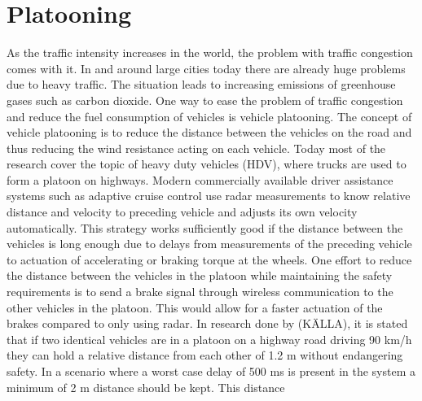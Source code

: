 \section{Platooning}
As the traffic intensity increases in the world, the problem with traffic congestion comes with it. In and around large cities today there are already huge problems due to heavy traffic. The situation leads to increasing emissions of greenhouse gases such as carbon dioxide. One way to ease the problem of traffic congestion and reduce the fuel consumption of vehicles is vehicle platooning. The concept of vehicle platooning is to reduce the distance between the vehicles on the road and thus reducing the wind resistance acting on each vehicle. Today most of the research cover the topic of heavy duty vehicles (HDV), where trucks are used to form a platoon on highways. Modern commercially available driver assistance systems such as adaptive cruise control use radar measurements to know relative distance and velocity to preceding vehicle and adjusts its own velocity automatically. This strategy works sufficiently good if the distance between the vehicles is long enough due to delays from measurements of the preceding vehicle to actuation of accelerating or braking torque at the wheels. One effort to reduce the distance between the vehicles in the platoon while maintaining the safety requirements is to send a brake signal through wireless communication to the other vehicles in the platoon. This would allow for a faster actuation of the brakes compared to only using radar. In research done by (KÄLLA), it is stated that if two identical vehicles are in a platoon on a highway road driving 90 km/h they can hold a relative distance from each other of 1.2 m without endangering safety. In a scenario where a worst case delay of 500 ms is present in the system a minimum of 2 m distance should be kept. This distance 